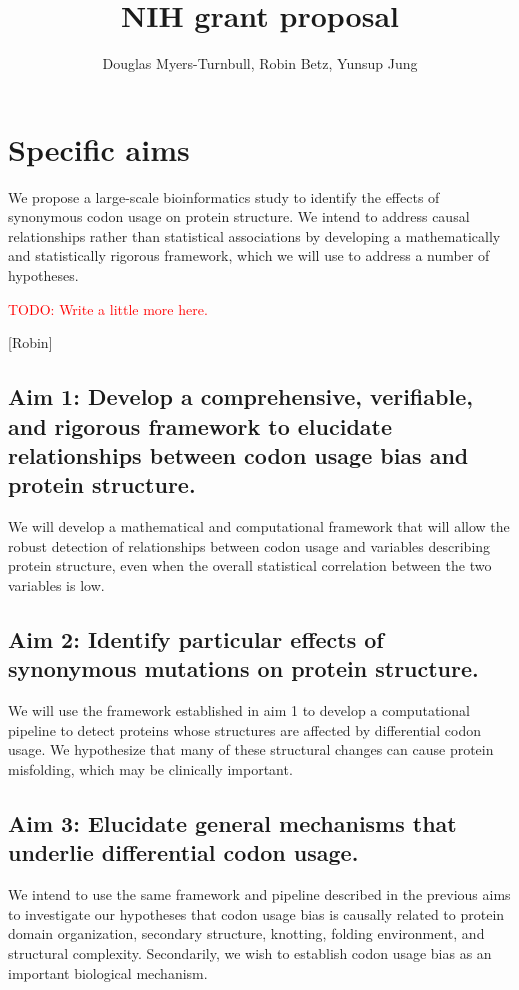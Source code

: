 \documentclass[11pt]{nih}
\title{\textbf{NIH grant proposal}}
\author{Douglas Myers-Turnbull, Robin Betz, Yunsup Jung}
\date{}
\newcommand{\todo}[1]{
\addcontentsline{tdo}{todo}{\protect{#1}}
\textcolor{red}{TODO: #1}
}
\begin{document}
\maketitle

\listoftodos

\tableofcontents


\section{Specific aims}


We propose a large-scale bioinformatics study to identify the effects of synonymous codon usage on protein structure. We intend to address causal relationships rather than statistical associations by developing a mathematically and statistically rigorous framework, which we will use to address a number of hypotheses. \todo{Write a little more here.}
[Robin]

\subsection{Aim 1: Develop a comprehensive, verifiable, and rigorous framework to elucidate relationships between codon usage bias and protein structure.}
We will develop a mathematical and computational framework that will allow the robust detection of relationships between codon usage and variables describing protein structure, even when the overall statistical correlation between the two variables is low.

\subsection{Aim 2: Identify particular effects of synonymous mutations on protein structure.}
We will use the framework established in aim 1 to develop a computational pipeline to detect proteins whose structures are affected by differential codon usage. We hypothesize that many of these structural changes can cause protein misfolding, which may be clinically important.

\subsection{Aim 3: Elucidate general mechanisms that underlie differential codon usage.}
We intend to use the same framework and pipeline described in the previous aims to investigate our hypotheses that codon usage bias is causally related to protein domain organization, secondary structure, knotting, folding environment, and structural complexity. Secondarily, we wish to establish codon usage bias as an important biological mechanism.
\end{document}
